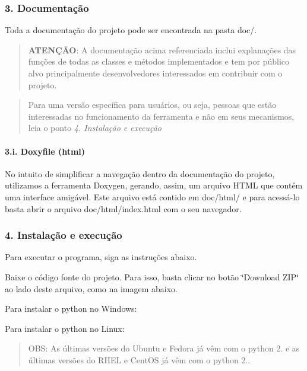 \subsubsection*{3. Documentação}

Toda a documentação do projeto pode ser encontrada na pasta doc/.

\begin{quotation}
{\bfseries A\-T\-E\-NÇÃ\-O}\-: A documentação acima referenciada inclui explanações das funções de todas as classes e métodos implementados e tem por público alvo principalmente desenvolvedores interessados em contribuir com o projeto.

\end{quotation}


\begin{quotation}
Para uma versão específica para usuários, ou seja, pessoas que estão interessadas no funcionamento da ferramenta e não em seus mecanismos, leia o ponto {\itshape 4. Instalação e execução}

\end{quotation}


\paragraph*{3.\-i. Doxyfile (html)}

No intuito de simplificar a navegação dentro da documentação do projeto, utilizamos a ferramenta Doxygen, gerando, assim, um arquivo H\-T\-M\-L que contém uma interface amigável. Este arquivo está contido em doc/html/ e para acessá-\/lo basta abrir o arquivo doc/html/index.\-html com o seu navegador.

\subsubsection*{4. Instalação e execução}

Para executar o programa, siga as instruções abaixo.


\begin{DoxyEnumerate}
\item Baixe o código fonte do projeto. Para isso, basta clicar no botão \char`\"{}\-Download Z\-I\-P\char`\"{} ao lado deste arquivo, como na imagem abaixo. 
\item Para instalar o python no Windows\-:
\item Para instalar o python no Linux\-: \begin{quotation}
O\-B\-S\-: As últimas versões do Ubuntu e Fedora já vêm com o python 2. e as últimas versões do R\-H\-E\-L e Cent\-O\-S já vêm com o python 2..

\end{quotation}

\end{DoxyEnumerate}

